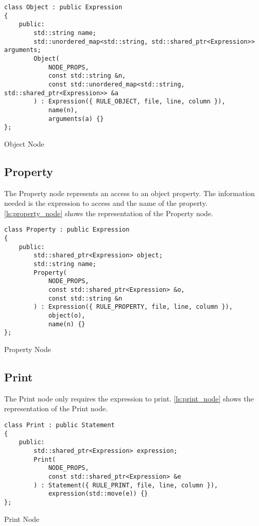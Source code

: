 \begin{listing}[H]
\begin{verbatim}
class Object : public Expression
{
    public:
        std::string name;
        std::unordered_map<std::string, std::shared_ptr<Expression>> arguments;
        Object(
            NODE_PROPS,
            const std::string &n,
            const std::unordered_map<std::string, std::shared_ptr<Expression>> &a
        ) : Expression({ RULE_OBJECT, file, line, column }),
            name(n),
            arguments(a) {}
};
\end{verbatim}
\caption{Object Node}
\label{ls:object_node}
\end{listing}

\subsection{Property}

The Property node represents an access to an object property.
The information needed is the expression to access and the name of the property.
\autoref{ls:property_node} shows the representation of the Property node.

\begin{listing}[H]
\begin{verbatim}
class Property : public Expression
{
    public:
        std::shared_ptr<Expression> object;
        std::string name;
        Property(
            NODE_PROPS,
            const std::shared_ptr<Expression> &o,
            const std::string &n
        ) : Expression({ RULE_PROPERTY, file, line, column }),
            object(o),
            name(n) {}
};
\end{verbatim}
\caption{Property Node}
\label{ls:property_node}
\end{listing}

\subsection{Print}

The Print node only requires the expression to print.
\autoref{ls:print_node} shows the representation of the Print node.

\begin{listing}[H]
\begin{verbatim}
class Print : public Statement
{
    public:
        std::shared_ptr<Expression> expression;
        Print(
            NODE_PROPS,
            const std::shared_ptr<Expression> &e
        ) : Statement({ RULE_PRINT, file, line, column }),
            expression(std::move(e)) {}
};
\end{verbatim}
\caption{Print Node}
\label{ls:print_node}
\end{listing}

